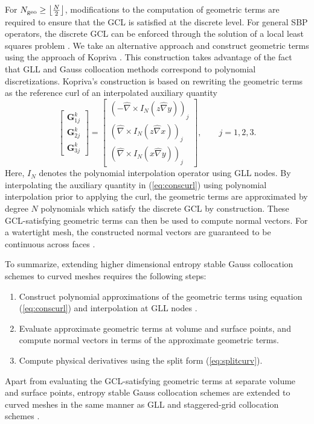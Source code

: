\documentclass[review,onefignum,onetabnum,final]{siamart171218}
\renewcommand{\hat}{\widehat}
\newcommand{\LRp}[1]{\left( #1 \right)}
\newcommand{\Grad} {\ensuremath{\nabla}}
\begin{document}
For $N_{\rm geo} \geq \left\lfloor\frac{N}{2}\right\rfloor$, modifications to the computation of geometric terms are required to ensure that the GCL is satisfied at the discrete level.  For general SBP operators, the discrete GCL can be enforced through the solution of a local least squares problem \cite{crean2018entropy}.  We take an alternative approach and  construct geometric terms using the approach of Kopriva \cite{kopriva2006metric}.  This construction takes advantage of the fact that GLL and Gauss collocation methods correspond to polynomial discretizations.  Kopriva's construction is based on rewriting the geometric terms as the reference curl of an interpolated auxiliary quantity
\begin{equation}
\begin{bmatrix}
\bm{G}^k_{1j}\\
\bm{G}^k_{2j}\\
\bm{G}^k_{3j}
\end{bmatrix} = \begin{bmatrix}
\LRp{-\hat{\Grad} \times I_N\LRp{z\hat{\Grad}y}}_j\\
\LRp{\hat{\Grad} \times I_N\LRp{z\hat{\Grad}x}}_j\\
\LRp{\hat{\Grad} \times I_N\LRp{x\hat{\Grad}y}}_j
\end{bmatrix}, \qquad j = 1,2,3.
\label{eq:conscurl}
\end{equation}
Here, $I_N$ denotes the polynomial interpolation operator using GLL nodes.  By interpolating the auxiliary quantity in (\ref{eq:conscurl}) using polynomial interpolation prior to applying the curl, the geometric terms are approximated by degree $N$ polynomials which satisfy the discrete GCL by construction.  These GCL-satisfying geometric terms can then be used to compute normal vectors.  For a watertight mesh, the constructed normal vectors are guaranteed to be continuous across faces \cite{chan2018discretely}.  %

To summarize, extending higher dimensional entropy stable Gauss collocation schemes to curved meshes requires the following steps: 
\begin{enumerate}
\item Construct polynomial approximations of the geometric terms using equation (\ref{eq:conscurl}) and interpolation at GLL nodes \cite{kopriva2006metric}.  
\item Evaluate approximate geometric terms at volume and surface points, and compute normal vectors in terms of the approximate geometric terms.  
\item Compute physical derivatives using the split form (\ref{eq:splitcurv}).  
\end{enumerate}
Apart from evaluating the GCL-satisfying geometric terms at separate volume and surface points, entropy stable Gauss collocation schemes are extended to curved meshes in the same manner as GLL and staggered-grid collocation schemes \cite{carpenter2014entropy, parsani2016entropy, chan2018discretely}.  
\end{document}

